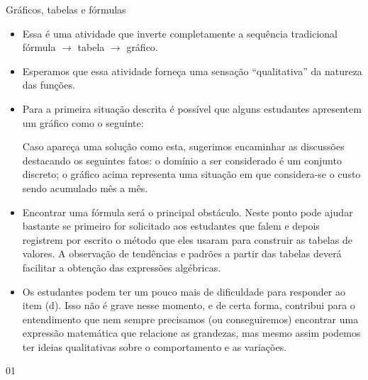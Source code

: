 \begin{sugestions}{Gráficos, tabelas e fórmulas}
{
\begin{itemize}

\item Essa é uma atividade que inverte completamente a sequência tradicional fórmula $\rightarrow$
tabela $\rightarrow$ gráfico.
\item Esperamos que essa atividade forneça uma sensação “qualitativa” da natureza das
funções.

\item Para a primeira situação descrita é possível que alguns estudantes apresentem um
gráfico como o seguinte:

\begin{figure}[H]
\centering
{}
\end{figure}

Caso apareça uma solução como esta, sugerimos encaminhar as discussões destacando
os seguintes fatos: o domínio a ser considerado é um conjunto discreto; o gráfico acima
representa uma situação em que considera-se o custo sendo acumulado mês a mês.

\item Encontrar uma fórmula será o principal obstáculo. Neste ponto pode ajudar bastante se
primeiro for solicitado aos estudantes que falem e depois registrem por escrito o
método que eles usaram para construir as tabelas de valores. A observação de
tendências e padrões a partir das tabelas deverá facilitar a obtenção das expressões
algébricas.

\item Os estudantes podem ter um pouco mais de dificuldade para responder ao item (d). Isso
não é grave nesse momento, e de certa forma, contribui para o entendimento que nem
sempre precisamos (ou conseguiremos) encontrar uma expressão matemática que
relacione as grandezas, mas mesmo assim podemos ter ideias qualitativas sobre o
comportamento e as variações.

\end{itemize}
}{0}{1}
\end{sugestions}
